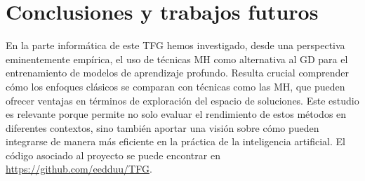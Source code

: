 \section{Conclusiones y trabajos futuros}

En la parte informática de este TFG hemos investigado, desde una perspectiva eminentemente empírica, el uso de técnicas MH como alternativa al GD para el entrenamiento de modelos de aprendizaje profundo. Resulta crucial comprender cómo los enfoques clásicos se comparan con técnicas como las MH, que pueden ofrecer ventajas en términos de exploración del espacio de soluciones. Este estudio es relevante porque permite no solo evaluar el rendimiento de estos métodos en diferentes contextos, sino también aportar una visión sobre cómo pueden integrarse de manera más eficiente en la práctica de la inteligencia artificial. El código asociado al proyecto se puede encontrar en \url{https://github.com/eedduu/TFG}.

